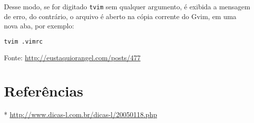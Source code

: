 Desse modo, se for digitado {\tt tvim} sem qualquer argumento, é exibida a mensagem de erro, do contrário,
o arquivo é aberto na cópia corrente do Gvim, em uma nova aba, por exemplo:

\begin{verbatim}
tvim .vimrc
\end{verbatim}

Fonte: \url{http://eustaquiorangel.com/posts/477}

\section{Referências}
\label{Referências}
* \url{http://www.dicas-l.com.br/dicas-l/20050118.php}
